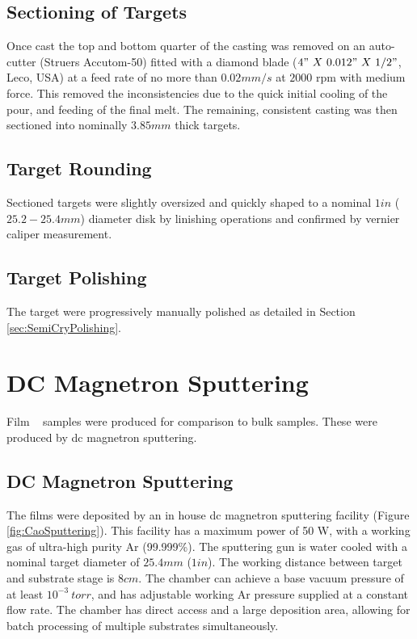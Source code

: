 \documentclass[a4paper,12pt,oneside]{report}%
\begin{document}
\subsection{Sectioning of Targets}
Once cast the top and bottom quarter of the casting was removed on an auto-cutter (Struers Accutom-50) fitted with a diamond blade ($4"~ X~ 0.012"~ X~ 1/2"$, Leco, USA) at a feed rate of no more than $0.02 mm/s$ at $2000$ \acrshort{rpm} with medium force. This removed the inconsistencies due to the quick initial cooling of the pour, and feeding of the final melt. The remaining, consistent casting was then sectioned into nominally $3.85 mm$ thick targets.

\subsection{Target Rounding}
Sectioned targets were slightly oversized and quickly shaped to a nominal $1 in$ ($25.2 - 25.4 mm$) diameter disk by linishing operations and confirmed by vernier caliper measurement.

\subsection{Target Polishing}
The target were progressively manually polished as detailed in Section \ref{sec:SemiCryPolishing}.

\section{DC Magnetron Sputtering}
Film \MgZnCa~ samples were produced for comparison to bulk samples. These were produced by \acrshort{dc} magnetron sputtering.

\subsection{DC Magnetron Sputtering}
The films were deposited by an in house \acrshort{dc} magnetron sputtering facility (Figure \ref{fig:CaoSputtering}). This facility has a maximum power of 50 W, with a working gas of ultra-high purity Ar (99.999\%). The sputtering gun is water cooled with a nominal target diameter of $25.4 mm$ ($1 in$). The working distance between target and substrate stage is $8 cm$. The chamber can achieve a base vacuum pressure of at least $10^{-3}~ torr$, and has adjustable working Ar pressure supplied at a constant flow rate. The chamber has direct access and a large deposition area, allowing for batch processing of multiple substrates simultaneously.
\end{document}
